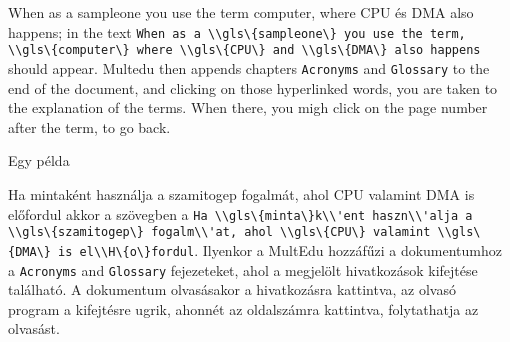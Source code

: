 {

When as a \gls{sampleone} you use the term \gls{computer},
where \gls{CPU} és \gls{DMA} also happens;
in the text \lstinline|When as a \\gls\{sampleone\} you use the term, \\gls\{computer\} where \\gls\{CPU\} and \\gls\{DMA\} also happens| should appear. Multedu then appends chapters \lstinline|Acronyms| and \lstinline|Glossary| to the end of the document, and clicking on those hyperlinked words, you are taken
to the explanation of the terms. When there, you migh click on the page number after the term, to go back.


}
{Egy példa}
{

Ha \gls{minta}ként használja a \gls{szamitogep} fogalmát,
ahol \gls{CPU} valamint \gls{DMA} is előfordul
akkor a szövegben a \lstinline|Ha \\gls\{minta\}k\\'ent haszn\\'alja a \\gls\{szamitogep\} fogalm\\'at,
ahol \\gls\{CPU\} valamint \\gls\{DMA\} is el\\H\{o\}fordul|.
Ilyenkor a MultEdu hozzáfűzi a dokumentumhoz a \lstinline|Acronyms| and \lstinline|Glossary| fejezeteket, ahol a megjelölt hivatkozások kifejtése 
található. A dokumentum olvasásakor a hivatkozásra kattintva, az olvasó 
program a kifejtésre ugrik, ahonnét az oldalszámra kattintva, folytathatja
az olvasást.

}




